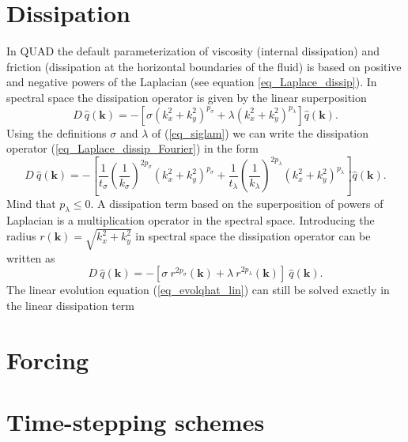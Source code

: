 \section{Dissipation} 
%
\label{ssec_Dschemes}
In QUAD the default parameterization of viscosity (internal dissipation) 
and friction (dissipation at the horizontal boundaries of the fluid) 
is based on positive and negative powers of the Laplacian 
(see equation \ref{eq_Laplace_dissip}). In spectral space the dissipation
operator is given by the linear superposition
\begin{equation} \label{eq_Laplace_dissip_Fourier}
   D \ \hat{q}(\mathbf{k})
    = - \left[
         \sigma \left(k_{x}^{2} + k_{y}^{2} \right)^{p_{\sigma}}
            + 
         \lambda \left(k_{x}^{2} + k_{y}^{2} \right)^{p_{\lambda}}
        \right]
        \hat{q}(\mathbf{k}).
\end{equation}
Using the definitions $\sigma$ and $\lambda$ of (\ref{eq_siglam})
we can write the dissipation operator (\ref{eq_Laplace_dissip_Fourier})
in the form
\begin{equation} \label{eq_Laplace_dissip_Fourier2}
   D \ \hat{q}(\mathbf{k})
    = - \left[
         \frac{1}{t_{\sigma}} 
         \left(\frac{1}{k_{\sigma}}\right)^{2 p_{\sigma}}  
         \left(k_{x}^{2} + k_{y}^{2} \right)^{p_{\sigma}}
          + 
         \frac{1}{t_{\lambda}} 
         \left(\frac{1}{k_{\lambda}}\right)^{2 p_{\lambda}}
         \left(k_{x}^{2} + k_{y}^{2} \right)^{p_{\lambda}}
        \right]
        \hat{q}(\mathbf{k}).
\end{equation}
Mind that $p_{\lambda} \le 0$. A dissipation term based on
the superposition of powers of Laplacian is a multiplication
operator in the spectral space. Introducing the radius 
$r(\mathbf{k}) = \sqrt{k^{2}_{x} + k^{2}_{y}}$ in spectral space 
the dissipation operator can be written as  
\begin{equation} \label{eq_Laplace_dissip_Fourier3}
   D \ \hat{q}(\mathbf{k})
    = 
   - \left[
       \sigma \ r^{2 p_{\sigma}}(\mathbf{k})
        +
       \lambda \ r^{2 p_{\lambda}}(\mathbf{k})
    \right] \ 
     \hat{q}(\mathbf{k}).
\end{equation}
The linear evolution equation (\ref{eq_evolqhat_lin}) can still be 
solved exactly in the linear dissipation term    


%
\section{Forcing}
%
\label{ssec_Fschemes}
%
\section{Time-stepping schemes}
%
\label{ssec_Tschemes}


